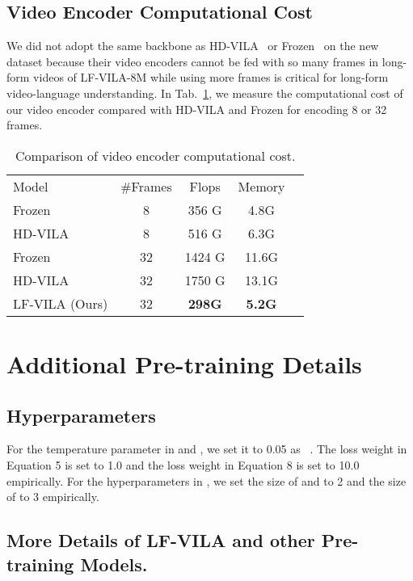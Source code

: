 \documentclass{article}
\begin{document}
\subsection{Video Encoder Computational Cost}
We did not adopt the same backbone as HD-VILA~\cite{xue2021hdvila} or Frozen~\cite{bain2021frozen} on the new dataset because their video encoders cannot be fed with so many frames in long-form videos of LF-VILA-8M  while using more frames is critical for long-form video-language understanding. In Tab.~\ref{tab:backbone}, we measure the computational cost of our video encoder compared with HD-VILA and Frozen for encoding 8 or 32 frames.

\begin{table}[t]
    \small
    \centering
    \caption{Comparison of video encoder computational cost.}
    \begin{tabular}{l c c c c} 
    \toprule
    Model & \#Frames  & Flops & Memory \\
    \cmidrule{1-4}
    Frozen~\cite{bain2021frozen} &8  & 356 G & 4.8G  \\
    HD-VILA~\cite{xue2021hdvila} &8  & 516 G & 6.3G \\
    Frozen~\cite{bain2021frozen} &32  & 1424 G & 11.6G  \\
    HD-VILA~\cite{xue2021hdvila} &32  & 1750 G & 13.1G \\
    \cmidrule{1-4}
    LF-VILA (Ours)  &32  & \bf298G & \bf5.2G  \\
    \bottomrule
    \end{tabular}
    \label{tab:backbone}
\end{table}


\section{Additional Pre-training Details}\label{sec:app_training}
\subsection{Hyperparameters}
For the temperature parameter  in  and  , we set it to 0.05 as ~\cite{bain2021frozen,xue2021hdvila}. The loss weight  in Equation 5 is set to 1.0 and the loss weight  in Equation 8 is set to 10.0 empirically. For the hyperparameters in , we set the size of  and  to 2 and the size of  to 3 empirically.

\subsection{More Details of LF-VILA and other Pre-training Models.}
\end{document}
